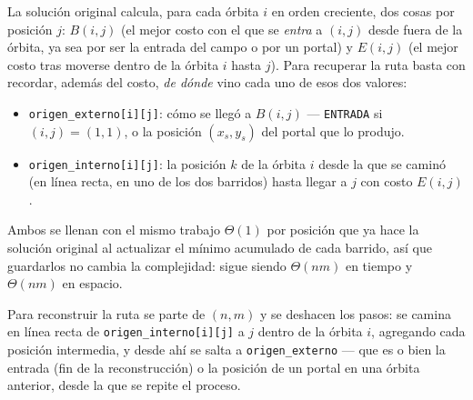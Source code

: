 La solución original calcula, para cada órbita $i$ en orden creciente, dos cosas por posición $j$: $B(i,j)$ (el mejor costo con el que se \emph{entra} a $(i,j)$ desde fuera de la órbita, ya sea por ser la entrada del campo o por un portal) y $E(i,j)$ (el mejor costo tras moverse dentro de la órbita $i$ hasta $j$). Para recuperar la ruta basta con recordar, además del costo, \emph{de dónde} vino cada uno de esos dos valores:

\begin{itemize}
  \item \texttt{origen\_externo[i][j]}: cómo se llegó a $B(i,j)$ --- \texttt{\textquotedbl ENTRADA\textquotedbl} si $(i,j) = (1,1)$, o la posición $(x_s, y_s)$ del portal que lo produjo.
  \item \texttt{origen\_interno[i][j]}: la posición $k$ de la órbita $i$ desde la que se caminó (en línea recta, en uno de los dos barridos) hasta llegar a $j$ con costo $E(i,j)$.
\end{itemize}

Ambos se llenan con el mismo trabajo $\Theta(1)$ por posición que ya hace la solución original al actualizar el mínimo acumulado de cada barrido, así que guardarlos no cambia la complejidad: sigue siendo $\Theta(nm)$ en tiempo y $\Theta(nm)$ en espacio.

Para reconstruir la ruta se parte de $(n,m)$ y se deshacen los pasos: se camina en línea recta de \texttt{origen\_interno[i][j]} a $j$ dentro de la órbita $i$, agregando cada posición intermedia, y desde ahí se salta a \texttt{origen\_externo} --- que es o bien la entrada (fin de la reconstrucción) o la posición de un portal en una órbita anterior, desde la que se repite el proceso.

